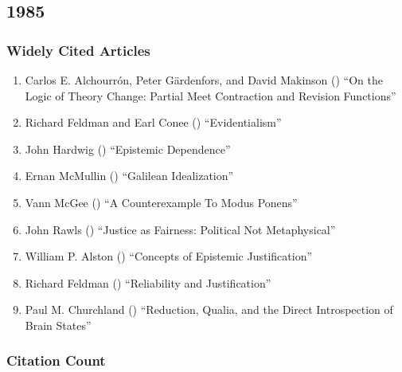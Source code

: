 \documentclass[
  10pt,
  letterpaper,
  DIV=11,
  numbers=noendperiod,
  twoside]{scrartcl}
\providecommand{\tightlist}{%
  \setlength{\itemsep}{0pt}\setlength{\parskip}{0pt}}\usepackage{longtable,booktabs,array}
\begin{document}
\newpage

\subsection{1985}\label{sec-s1985}

\subsubsection*{Widely Cited Articles}\label{widely-cited-articles-28}

\begin{enumerate}
\def\labelenumi{\arabic{enumi}.}
\tightlist
\item
  Carlos E. Alchourrón, Peter Gärdenfors, and David Makinson
  () ``On the Logic of Theory
  Change: Partial Meet Contraction and Revision Functions''
\item
  Richard Feldman and Earl Conee
  () ``Evidentialism''
\item
  John Hardwig () ``Epistemic
  Dependence''
\item
  Ernan McMullin () ``Galilean
  Idealization''
\item
  Vann McGee () ``A
  Counterexample To Modus Ponens''
\item
  John Rawls () ``Justice as
  Fairness: Political Not Metaphysical''
\item
  William P. Alston () ``Concepts
  of Epistemic Justification''
\item
  Richard Feldman ()
  ``Reliability and Justification''
\item
  Paul M. Churchland ()
  ``Reduction, Qualia, and the Direct Introspection of Brain States''
\end{enumerate}

\subsubsection*{Citation Count}\label{sec-count-1985}
\end{document}
